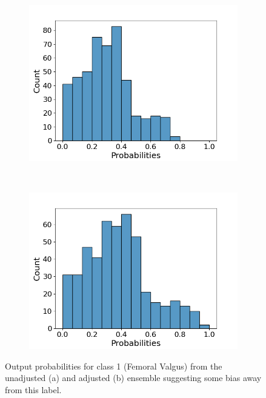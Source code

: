 \begin{figure}
  \centering
  \begin{subfigure}[t]{0.45\textwidth}
  \includegraphics[width=\textwidth]{files/figs/met/probs-1.png}
  \caption{}
  \label{fig:prob-1}
\end{subfigure}
~
\begin{subfigure}[t]{0.45\textwidth}
  \includegraphics[width=\textwidth]{files/figs/met/probs-1-adjusted.png}
  \caption{}
  \label{fig:prob-adjusted}
\end{subfigure}
  \caption{Output probabilities for class 1 (Femoral Valgus) from the unadjusted (a) and adjusted (b) ensemble suggesting some bias away from this label.}
  \label{fig:bias-1}
\end{figure}

